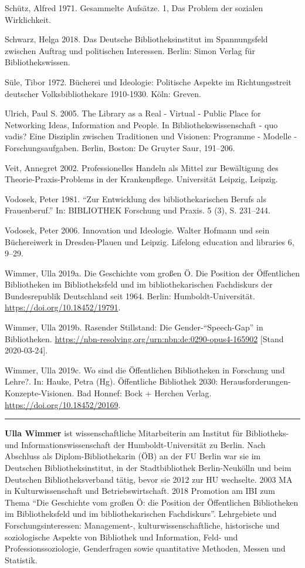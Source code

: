 \documentclass[a4paper,
fontsize=11pt,
oneside,
numbers=noperiodatend,
parskip=half-,
bibliography=totoc,
final
]{scrartcl}
\begin{document}
Schütz, Alfred 1971. Gesammelte Aufsätze. 1, Das Problem der sozialen
Wirklichkeit.

Schwarz, Helga 2018. Das Deutsche Bibliotheksinstitut im Spannungsfeld
zwischen Auftrag und politischen Interessen. Berlin: Simon Verlag für
Bibliothekswissen.

Süle, Tibor 1972. Bücherei und Ideologie: Politische Aspekte im
Richtungsstreit deutscher Volksbibliothekare 1910-1930. Köln: Greven.

Ulrich, Paul S. 2005. The Library as a Real - Virtual - Public Place for
Networking Ideas, Information and People. In Bibliothekswissenschaft -
quo vadis? Eine Disziplin zwischen Traditionen und Visionen: Programme -
Modelle - Forschungsaufgaben. Berlin, Boston: De Gruyter Saur, 191--206.

Veit, Annegret 2002. Professionelles Handeln als Mittel zur Bewältigung
des Theorie-Praxis-Problems in der Krankenpflege. Universität Leipzig,
Leipzig.

Vodosek, Peter 1981. \enquote{Zur Entwicklung des bibliothekarischen
Berufs als Frauenberuf.} In: BIBLIOTHEK Forschung und Praxis. 5 (3), S.
231--244.

Vodosek, Peter 2006. Innovation und Ideologie. Walter Hofmann und sein
Büchereiwerk in Dresden-Plauen und Leipzig. Lifelong education and
libraries 6, 9--29.

Wimmer, Ulla 2019a. Die Geschichte vom großen Ö. Die Position der
Öffentlichen Bibliotheken im Bibliotheksfeld und im bibliothekarischen
Fachdiskurs der Bundesrepublik Deutschland seit 1964. Berlin:
Humboldt-Universität. \url{https://doi.org/10.18452/19791}.

Wimmer, Ulla 2019b. Rasender Stillstand: Die Gender-\enquote{Speech-Gap}
in Bibliotheken.
\url{https://nbn-resolving.org/urn:nbn:de:0290-opus4-165902} {[}Stand
2020-03-24{]}.

Wimmer, Ulla 2019c. Wo sind die Öffentlichen Bibliotheken in Forschung
und Lehre?. In: Hauke, Petra (Hg). Öffentliche Bibliothek 2030:
Herausforderungen-Konzepte-Visionen. Bad Honnef: Bock + Herchen Verlag.
\url{https://doi.org/10.18452/20169}.

\begin{center}\rule{0.5\linewidth}{0.5pt}\end{center}

\textbf{Ulla Wimmer} ist wissenschaftliche Mitarbeiterin am Institut für
Bibliotheks- und Informationswissenschaft der Humboldt-Universität zu
Berlin. Nach Abschluss als Diplom-Bibliothekarin (ÖB) an der FU Berlin
war sie im Deutschen Bibliotheksinstitut, in der Stadtbibliothek
Berlin-Neukölln und beim Deutschen Bibliotheksverband tätig, bevor sie
2012 zur HU wechselte. 2003 MA in Kulturwissenschaft und
Betriebswirtschaft. 2018 Promotion am IBI zum Thema ``Die Geschichte vom
großen Ö: die Position der Öffentlichen Bibliotheken im Bibliotheksfeld
und im bibliothekarischen Fachdiskurs''. Lehrgebiete und
Forschungsinteressen: Management-, kulturwissenschaftliche, historische
und soziologische Aspekte von Bibliothek und Information, Feld- und
Professionssoziologie, Genderfragen sowie quantitative Methoden, Messen
und Statistik.
\end{document}
